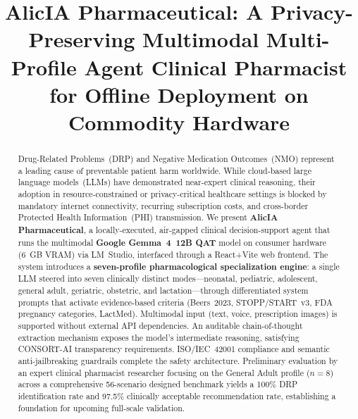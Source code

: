 \documentclass[9pt,conference]{IEEEtran}
\begin{document}
\title{AlicIA 
Pharmaceutical: A Privacy-Preserving Multimodal Multi-Profile Agent Clinical Pharmacist for Offline Deployment on Commodity Hardware}
\author{
}


\maketitle

\begin{abstract}
Drug-Related Problems~(DRP) and Negative Medication Outcomes~(NMO) represent
a leading cause of preventable patient harm worldwide. While cloud-based large
language models~(LLMs) have demonstrated near-expert clinical reasoning, their
adoption in resource-constrained or privacy-critical healthcare settings is
blocked by mandatory internet connectivity, recurring subscription costs, and
cross-border Protected Health Information~(PHI) transmission.
We present \textbf{AlicIA Pharmaceutical}, a locally-executed,
air-gapped clinical decision-support agent that runs the multimodal
\textbf{Google Gemma~4~12B QAT} model on consumer hardware
(6~GB VRAM) via LM~Studio, interfaced through a React+Vite web frontend.
The system introduces a \textbf{seven-profile pharmacological specialization engine}:
a single LLM steered into seven clinically distinct modes---neonatal, pediatric,
adolescent, general adult, geriatric, obstetric, and lactation---through
differentiated system prompts that activate evidence-based criteria
(Beers~2023, STOPP/START~v3, FDA pregnancy categories, LactMed).
Multimodal input (text, voice, prescription images) is supported without
external API dependencies. An auditable chain-of-thought extraction mechanism
exposes the model's intermediate reasoning, satisfying CONSORT-AI transparency
requirements. ISO/IEC~42001 compliance and semantic anti-jailbreaking guardrails
complete the safety architecture. Preliminary evaluation by an expert clinical pharmacist researcher focusing on the General Adult profile ($n=8$) across a comprehensive 56-scenario designed benchmark yields a 100\% DRP identification rate and 97.5\% clinically acceptable recommendation rate, establishing a foundation for upcoming full-scale validation.
\end{abstract}
\end{document}
